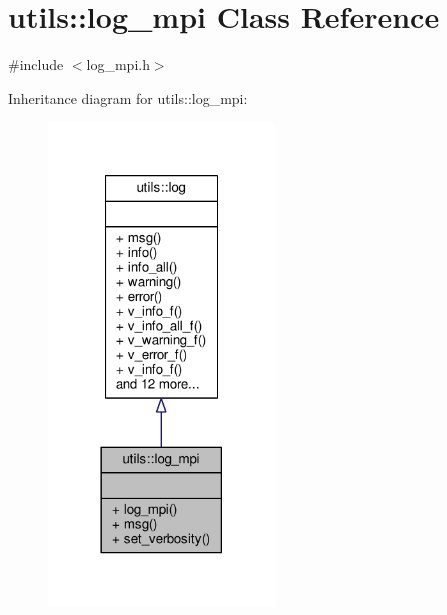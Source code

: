 \hypertarget{classutils_1_1log__mpi}{\section{utils\-:\-:log\-\_\-mpi Class Reference}
\label{classutils_1_1log__mpi}
}


{\ttfamily \#include $<$log\-\_\-mpi.\-h$>$}



Inheritance diagram for utils\-:\-:log\-\_\-mpi\-:\nopagebreak
\begin{figure}[H]
\begin{center}
\leavevmode
\includegraphics[width=170pt]{classutils_1_1log__mpi__inherit__graph}
\end{center}
\end{figure}



